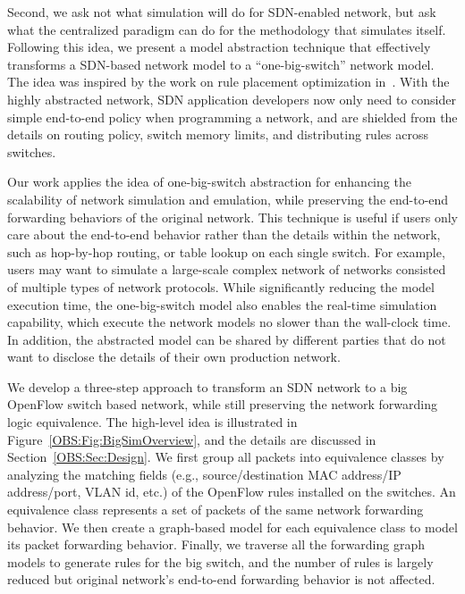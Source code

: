 \label{OBS:Sec:Intro}

Second, we ask not what simulation will do for SDN-enabled network, but ask what the centralized paradigm can do for the methodology that simulates itself.
Following this idea, we present a model abstraction technique that effectively transforms
a SDN-based network model to a ``one-big-switch'' network model.
The idea was inspired by the work on rule placement optimization in~\cite{OneBigSwitchAbstraction}.
With the highly abstracted network, SDN application developers now only need to consider
simple end-to-end policy when programming a network,
and are shielded from the details on routing policy, switch memory limits,
and distributing rules across switches.

Our work applies the idea of one-big-switch abstraction for enhancing the scalability
of network simulation and emulation, while preserving the end-to-end forwarding behaviors of the original network.
This technique is useful if users only care about the end-to-end behavior rather than
the details within the network, such as hop-by-hop routing, or table lookup on each single switch.
For example, users may want to simulate a large-scale complex network of networks consisted of multiple types of network protocols.
While significantly reducing the model execution time, the one-big-switch model also enables the real-time simulation capability,
which execute the network models no slower than the wall-clock time.
In addition, the abstracted model can be shared by different parties that do not want to disclose the details
of their own production network.

We develop a three-step approach to transform an SDN network to a big OpenFlow switch based network,
while still preserving the network forwarding logic equivalence.
The high-level idea is illustrated in Figure~\ref{OBS:Fig:BigSimOverview},
and the details are discussed in Section~\ref{OBS:Sec:Design}.
We first group all packets into equivalence classes by analyzing the matching fields
(e.g., source/destination MAC address/IP address/port, VLAN id, etc.)
of the OpenFlow rules installed on the switches.
An equivalence class represents a set of packets of the same network forwarding behavior.
We then create a graph-based model for each equivalence class to model its packet forwarding behavior.
Finally, we traverse all the forwarding graph models to generate rules for the big switch,
and the number of rules is largely reduced but original network's end-to-end forwarding behavior is not affected.

